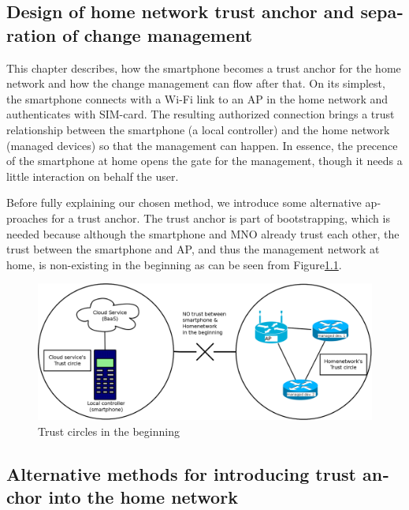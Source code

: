 \documentclass[12pt,a4paper,english]{tutthesis}
\begin{document}
\begin{otherlanguage}{english}
\chapter{Design of home network trust anchor and separation of change management}
\label{sec-4}





This chapter describes, how the smartphone becomes a trust anchor for
the home network and how the change management can flow after that.
On its simplest, the smartphone connects with a Wi-Fi link to an
AP in the home network and authenticates with SIM-card.
The resulting authorized connection brings a trust relationship
between the smartphone (a local controller)
and the home network (managed devices) so that the 
management can happen. 
In essence, the precence of the smartphone at home
opens the gate for the management, though it needs a little
interaction on behalf the user.



Before fully explaining our chosen method, we introduce some 
alternative
approaches for a trust anchor. The trust anchor is part of bootstrapping,
which is needed because although the smartphone and MNO
already trust each other, the trust between the smartphone and AP, and
thus the management network at home, is non-existing in the
beginning as can be seen from Figure\ref{fig:trustbegin}.

\begin{figure}[htb]
\centering
\includegraphics[width=.9\linewidth]{trustcircles.png}
\caption{\label{fig:trustbegin}Trust circles in the beginning}
\end{figure}

\section{Alternative methods for introducing trust anchor into the home network}
\label{sec-4-1}
\label{sec:altmethods}




\end{otherlanguage}
\end{document}
